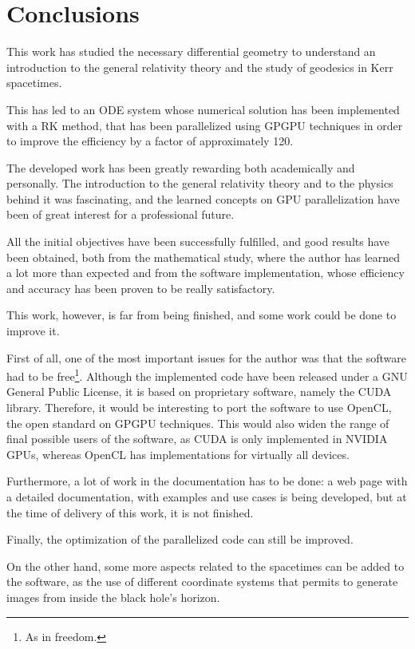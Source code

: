 \chapter*{Conclusions}

This work has studied the necessary differential geometry to understand an introduction to the general relativity theory and the study of geodesics in Kerr spacetimes.

This has led to an \ac{ODE} system whose numerical solution has been implemented with a \ac{RK} method, that has been parallelized using \ac{GPGPU} techniques in order to improve the efficiency by a factor of approximately 120.

The developed work has been greatly rewarding both academically and personally. The introduction to the general relativity theory and to the physics behind it was fascinating, and the learned concepts on \ac{GPU} parallelization have been of great interest for a professional future.

All the initial objectives have been successfully fulfilled, and good results have been obtained, both from the mathematical study, where the author has learned a lot more than expected and from the software implementation, whose efficiency and accuracy has been proven to be really satisfactory.

This work, however, is far from being finished, and some work could be done to improve it.

First of all, one of the most important issues for the author was that the software had to be free\footnote{As in freedom.}. Although the implemented code have been released under a GNU General Public License, it is based on proprietary software, namely the \ac{CUDA} library. Therefore, it would be interesting to port the software to use OpenCL, the open standard on \ac{GPGPU} techniques. This would also widen the range of final possible users of the software, as \ac{CUDA} is only implemented in NVIDIA \acp{GPU}, whereas OpenCL has implementations for virtually all devices.

Furthermore, a lot of work in the documentation has to be done: a web page with a detailed documentation, with examples and use cases is being developed, but at the time of delivery of this work, it is not finished.

Finally, the optimization of the parallelized code can still be improved.

On the other hand, some more aspects related to the spacetimes can be added to the software, as the use of different coordinate systems that permits to generate images from inside the black hole's horizon.